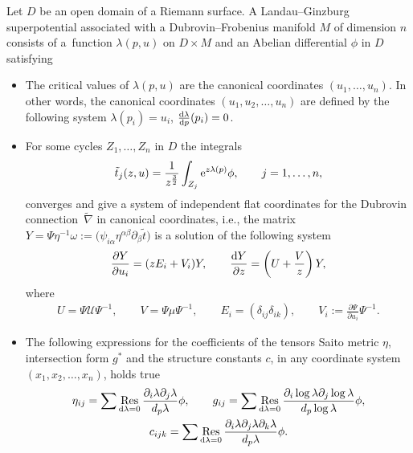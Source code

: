 \documentclass[11pt]{article}
\numberwithin{equation}{section}
\numberwithin{equation}{section}
\DeclareMathOperator*{\res}{Res}
\begin{document}
\begin{Definition}\label{Landau--Ginzburg superpotential definition}
Let $D$ be an open domain of a Riemann surface. A Landau--Ginzburg superpotential associated with a Dubrovin--Frobenius manifold $M$ of dimension $n$ consists of a~function $\lambda(p,u)$ on $D \times M$ and an Abelian differential $\phi$ in $D$ satisfying
\begin{itemize}\itemsep=0pt
\item The critical values of $\lambda(p,u)$ are the canonical coordinates $(u_1,\dots,u_n)$. In other words, the canonical coordinates $(u_1,u_2,\dots ,u_n)$ are defined by the following system
$\lambda(p_i)=u_i$, $\frac{{\rm d} \lambda}{{\rm d}p}( p_i)=0$.
\item For some cycles $Z_1,\dots,Z_n$ in $D$ the integrals
\begin{gather}\label{Mirror symmetry}
\tilde t_j(z,u)=\frac{1}{z^{\frac{3}{2}}}\int_{Z_j}{\rm e}^{z\lambda(p)}\phi, \qquad j=1,\dots,n,
\end{gather}
converges and give a system of independent flat coordinates for the Dubrovin connection~$\tilde\nabla$ in canonical coordinates, i.e., the matrix
$Y=\Psi\eta^{-1}\omega:=\bigl(\psi_{i\alpha}\eta^{\alpha\beta}\partial_{\beta}\tilde t \bigr)$
is a solution of the following system
\begin{gather}\label{Dubrovin connection in canonical coordinates 1}
\frac{\partial Y}{\partial u_i}=( zE_i+V_i )Y,\qquad
\frac{{\rm d}Y}{\partial z}=\left( U+\frac{V}{z} \right)Y,
\end{gather}
where
\begin{gather}\label{U,V, Vi in canonical coordinates}
U=\Psi\mathcal{U}\Psi^{-1}, \qquad V=\Psi\mu\Psi^{-1}, \qquad E_i=( \delta_{ij}\delta_{ik} ), \qquad V_i:=\frac{\partial \Psi}{\partial u_i}\Psi^{-1}.
\end{gather}

\item
The following expressions for the coefficients of the tensors Saito metric $\eta$, intersection form $g^{*}$ and the structure constants $c$, in any coordinate system $(x_1,x_2,\dots,x_n)$, holds true
\begin{gather}
\eta_{ij}=\sum \res_{{\rm d}\lambda=0} \frac{ \partial_i\lambda \partial_j\lambda }{d_p\lambda }\phi, \qquad
g_{ij}=\sum \res_{{\rm d}\lambda=0} \frac{ \partial_i\log\lambda \partial_j\log\lambda }{d_p\log\lambda } \phi,\nonumber\\
c_{ijk}=\sum \res_{{\rm d}\lambda=0} \frac{ \partial_i\lambda \partial_j\lambda \partial_k\lambda }{d_p\lambda }\phi.\label{residue expression for eta, intersection form and structure constants}
\end{gather}
\end{itemize}
\end{Definition}
\end{document}
